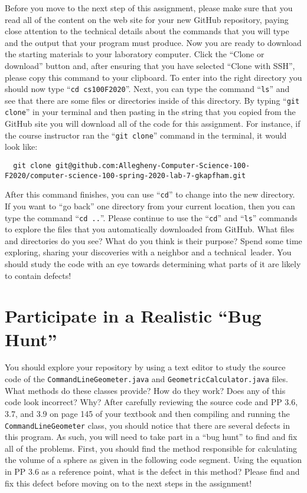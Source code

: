 \documentclass[11pt]{article}
\newcommand{\command}[1]{``\lstinline{#1}''}
\newcommand{\step}[1]{``{#1}''}
\begin{document}
Before you move to the next step of this assignment, please make sure that you
read all of the content on the web site for your new GitHub repository, paying
close attention to the technical details about the commands that you will type
and the output that your program must produce. Now you are ready to download the
starting materials to your laboratory computer. Click the ``Clone or download''
button and, after ensuring that you have selected ``Clone with SSH'', please
copy this command to your clipboard. To enter into the right directory you
should now type \command{cd cs100F2020}. Next, you can type the command
\command{ls} and see that there are some files or directories inside of this
directory. By typing \command{git clone} in your terminal and then pasting in
the string that you copied from the GitHub site you will download all of the
code for this assignment. For instance, if the course instructor ran the
\command{git clone} command in the terminal, it would look like:

\begin{lstlisting}
  git clone git@github.com:Allegheny-Computer-Science-100-F2020/computer-science-100-spring-2020-lab-7-gkapfham.git
\end{lstlisting}

After this command finishes, you can use \command{cd} to change into the new
directory. If you want to \step{go back} one directory from your current
location, then you can type the command \command{cd ..}. Please continue to use
the \command{cd} and \command{ls} commands to explore the files that you
automatically downloaded from GitHub. What files and directories do you see?
What do you think is their purpose? Spend some time exploring, sharing your
discoveries with a neighbor and a \mbox{technical leader}. You should study the
code with an eye towards determining what parts of it are likely to contain
defects!

\section*{Participate in a Realistic ``Bug Hunt''}

You should explore your repository by using a text editor to study the source
code of the {\tt CommandLineGeometer.java} and {\tt GeometricCalculator.java}
files. What methods do these classes provide? How do they work? Does any of this
code look incorrect? Why? After carefully reviewing the source code and PP 3.6,
3.7, and 3.9 on page 145 of your textbook and then compiling and running the
{\tt CommandLineGeometer} class, you should notice that there are several
defects in this program. As such, you will need to take part in a ``bug hunt''
to find and fix all of the problems. First, you should find the method
responsible for calculating the volume of a sphere as given in the following
code segment. Using the equation in PP 3.6 as a reference point, what is the
defect in this method? Please find and fix this defect before moving on to the
next steps in the assignment!
\end{document}
